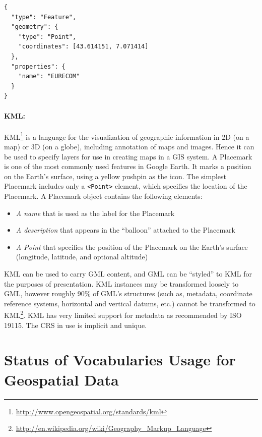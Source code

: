 \begin{verbatim}
{
  "type": "Feature",
  "geometry": {
    "type": "Point",
    "coordinates": [43.614151, 7.071414]
  },
  "properties": {
    "name": "EURECOM"
  }
}
\end{verbatim}

 
 \paragraph{KML:}
KML\footnote{\url{http://www.opengeospatial.org/standards/kml}} is a language for the visualization of geographic information in 2D (on a map) or 3D (on a globe), including annotation of maps and images. Hence it can be used to specify layers for use in creating maps in a GIS system.  A Placemark is one of the most commonly used features in Google Earth. It marks a position on the Earth's surface, using a yellow pushpin as the icon. The simplest Placemark includes only a \texttt{<Point>} element, which specifies the location of the Placemark.
A Placemark object contains the following elements:
\begin{itemize}
\item \textit{A name} that is used as the label for the Placemark
\item \textit{A description} that appears in the ``balloon'' attached to the Placemark
\item \textit{A Point} that specifies the position of the Placemark on the Earth's surface (longitude, latitude, and optional altitude)
\end{itemize}

KML can be used to carry GML content, and GML can be ``styled'' to KML for the purposes of presentation. KML instances may be transformed loosely to GML, however roughly 90\% of GML's structures (such as, metadata, coordinate reference systems, horizontal and vertical datums, etc.) cannot be transformed to KML\footnote{\url{http://en.wikipedia.org/wiki/Geography_Markup_Language}}. KML has very limited support for metadata as recommended by ISO 19115. The CRS in use is implicit and unique.

\section{Status of Vocabularies Usage for Geospatial Data}
\label{sec:vocgeoreview}

